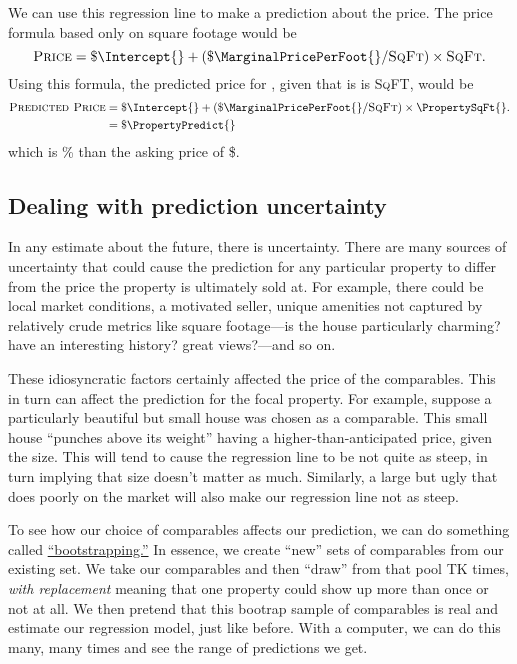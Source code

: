 \documentclass[
10pt, %
a4paper, %
oneside, %
headinclude,footinclude, %
BCOR5mm, %
]{scrartcl}
\begin{document}
We can use this regression line to make a prediction about the price. 
The price formula based only on square footage would be
\begin{equation}
  \textsc{Price} = \$ \Intercept{} + (\$ \MarginalPricePerFoot{}/\textsc{SqFt}) \times \textsc{SqFt}. \nonumber
\end{equation}
Using this formula, the predicted price for \PropertyName{}, given that is is \PropertySqFt{} \textsc{SqFT}, would be
\begin{align}
\textsc{Predicted Price} & = \$ \Intercept{} + (\$ \MarginalPricePerFoot{}/\textsc{SqFt}) \times \PropertySqFt{}. \\ \nonumber
                         & = \$ \PropertyPredict{} \nonumber 
\end{align}
which is \PctDiff{}\% \ComparePredictedToActual{} than the asking price of \$\PropertyPrice{}.

\subsection{Dealing with prediction uncertainty} 
In any estimate about the future, there is uncertainty.
There are many sources of uncertainty that could cause the prediction for any particular property to differ from the price the property is ultimately sold at.
For example, there could be local market conditions, a motivated seller, unique amenities not captured by relatively crude metrics like square footage---is the house particularly charming? have an interesting history? great views?---and so on. 

These idiosyncratic factors certainly affected the price of the comparables.
This in turn can affect the prediction for the focal property. 
For example, suppose a particularly beautiful but small house was chosen as a comparable.
This small house ``punches above its weight'' having a higher-than-anticipated price, given the size.
This will tend to cause the regression line to be not quite as steep, in turn implying that size doesn't matter as much.
Similarly, a large but ugly that does poorly on the market will also make our regression line not as steep.

To see how our choice of comparables affects our prediction, we can do something called \href{https://en.wikipedia.org/wiki/Bootstrapping_(statistics)}{``bootstrapping.''}
In essence, we create ``new'' sets of comparables from our existing set.
We take our comparables and then ``draw'' from that pool TK times, \emph{with replacement} meaning that one property could show up more than once or not at all.
We then pretend that this bootrap sample of comparables is real and estimate our regression model, just like before.
With a computer, we can do this many, many times and see the range of predictions we get. 
\end{document}

